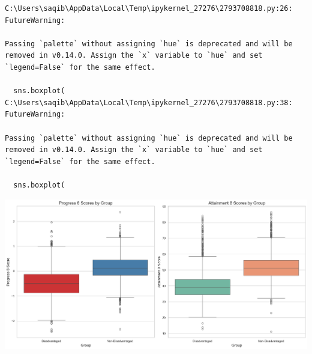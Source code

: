 \documentclass[
  letterpaper,
  DIV=11,
  numbers=noendperiod]{scrartcl}
\begin{document}
\begin{verbatim}
C:\Users\saqib\AppData\Local\Temp\ipykernel_27276\2793708818.py:26: FutureWarning: 

Passing `palette` without assigning `hue` is deprecated and will be removed in v0.14.0. Assign the `x` variable to `hue` and set `legend=False` for the same effect.

  sns.boxplot(
C:\Users\saqib\AppData\Local\Temp\ipykernel_27276\2793708818.py:38: FutureWarning: 

Passing `palette` without assigning `hue` is deprecated and will be removed in v0.14.0. Assign the `x` variable to `hue` and set `legend=False` for the same effect.

  sns.boxplot(
\end{verbatim}

\includegraphics{P4DS_A2_Data_Analysis_Project_files/figure-pdf/cell-63-output-2.png}
\end{document}

